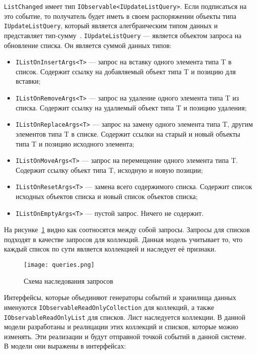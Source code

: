 \lstinline[style=csharpinlinestyle]!ListChanged! имеет тип \lstinline[style=csharpinlinestyle]!IObservable<IUpdateListQuery>!.
Если подписаться на это событие, то получатель будет иметь в своем распоряжении объекты типа \lstinline[style=csharpinlinestyle]!IUpdateListQuery!,
который является алегбраическим типом данных и представляет тип-сумму~\cite{algebraic_data_type}.
\lstinline[style=csharpinlinestyle]!IUpdateListQuery! --- является объектом запроса на обновление списка.
Он является суммой данных типов:

\begin{itemize}
  \item \lstinline[style=csharpinlinestyle]!IListOnInsertArgs<T>! --- запрос на вставку одного элемента типа T в список. Содержит ссылку на добавляемый объект типа T и позицию для вставки;
  \item \lstinline[style=csharpinlinestyle]!IListOnRemoveArgs<T>! --- запрос на удаление одного элемента типа T из списка. Содержит ссылку на удаляемый объект типа T и позицию удаления;
  \item \lstinline[style=csharpinlinestyle]!IListOnReplaceArgs<T>! --- запрос на замену одного элемента типа T, другим элементов типа T в списке.
  Содержит ссылки на старый и новый объекты типа T и позицию исходного элемента;
  \item \lstinline[style=csharpinlinestyle]!IListOnMoveArgs<T>! --- запрос на перемещение одного элемента типа T. Содержит ссылку объект типа T, исходную и новую позиции;
  \item \lstinline[style=csharpinlinestyle]!IListOnResetArgs<T>! --- замена всего содержимого списка. Содержит список исходных объектов списка и новый список объектов списка;
  \item \lstinline[style=csharpinlinestyle]!IListOnEmptyArgs<T>! --- пустой запрос. Ничего не содержит.
\end{itemize}

На рисунке~\ref{fig:queries} видно как соотносятся между собой запросы. Запросы для списков подходят в качестве запросов для коллекций.
Данная модель учитывает то, что каждый список по сути является коллекцией и наследует её признаки.

\begin{figure}[ht]
\centering
  \texttt{[image: queries.png]}
  \caption{ Схема наследования запросов }
  \label{fig:queries}
\end{figure}

Интерфейсы, которые объединяют генераторы событий и хранилища данных именуются \lstinline[style=csharpinlinestyle]!IObservableReadOnlyCollection! для коллекций, а также \lstinline[style=csharpinlinestyle]!IObservableReadOnlyList! для списков.
Лист наследуется коллекции. В данной модели разработаны и реалицации этих коллекций и списков, которые можно изменять. Эти реализации и будут отправной точкой событий в данной системе.
В модели они выражены в интерфейсах:

